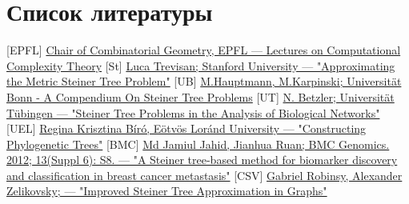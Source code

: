 \documentclass[11pt,a4paper]{report}
\theoremstyle{definition}
\theoremstyle{definition}
\theoremstyle{definition}
\begin{document}
	\section{Список литературы}
	\renewcommand\bibname{}
	\patchcmd{\thebibliography}{\chapter*}{\section*}{}{}
	\vspace*{-1cm}
	\begin{thebibliography}{}
		 \href{https://dcg.epfl.ch/wp-content/uploads/2018/10/9-NPHardness.pdf}{Chair of Combinatorial Geometry, EPFL — Lectures on Computational Complexity Theory}
		[St] \href{https://people.eecs.berkeley.edu/~luca/cs261/lecture02.pdf}{Luca Trevisan; Stanford University — "Approximating the Metric Steiner Tree Problem"}
		[UB]
		 \href{http://theory.cs.uni-bonn.de/info5/steinerkompendium/netcompendium.pdf}{M.Hauptmann, M.Karpinski; Universität Bonn - A Compendium On Steiner Tree Problems}
		[UT] \href{https://fpt.akt.tu-berlin.de/publications/steiner-tree-betzler06.pdf}{N. Betzler; Universität Tübingen — "Steiner Tree Problems in the Analysis of Biological Networks"}
		 \href{http://web.cs.elte.hu/~berkri/Theses/Biro.pdf }{Regina Krisztina Bíró, Eötvös Loránd University — "Constructing Phylogenetic Trees"}
		 \href{https://www.ncbi.nlm.nih.gov/pmc/articles/PMC3481447/}{Md Jamiul Jahid, Jianhua Ruan; BMC Genomics. 2012; 13(Suppl 6): S8. — "A Steiner tree-based method for biomarker discovery and classification in breast cancer metastasis"}
		 \href{https://www.cs.virginia.edu/~robins/papers/soda2000_camera.pdf}{Gabriel Robinsy, Alexander Zelikovsky; — "Improved Steiner Tree Approximation in Graphs"}
	\end{thebibliography}
\end{document}

